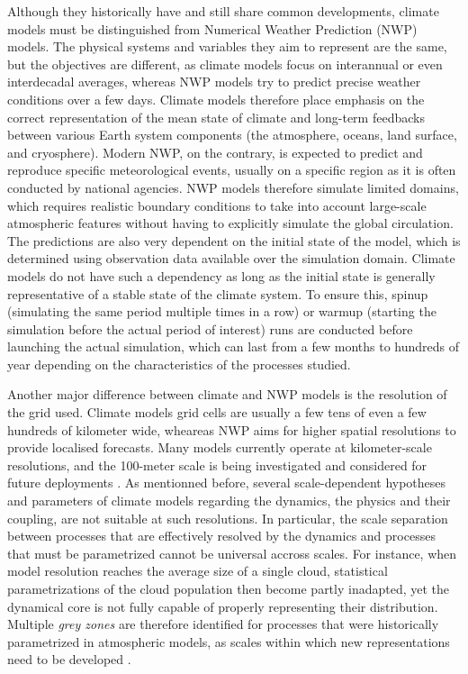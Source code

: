 Although they historically have and still share common developments, climate models must be distinguished from  Numerical Weather Prediction (NWP) models.
The physical systems and variables they aim to represent are the same, but the objectives are different, as climate models focus on interannual or even interdecadal averages, whereas NWP models try to predict precise weather conditions over a few days. 
Climate models therefore place emphasis on the correct representation of the mean state of climate and long-term feedbacks between various Earth system components (the atmosphere, oceans, land surface, and cryosphere).
Modern NWP, on the contrary, is expected to predict and reproduce specific meteorological events, usually on a specific region as it is often conducted by national agencies. NWP models therefore simulate limited domains, which requires realistic boundary conditions to take into account large-scale atmospheric features without having to explicitly simulate the global circulation. 
The predictions are also very dependent on the initial state of the model, which is determined using observation data available over the simulation domain. Climate models do not have such a dependency as long as the initial state is generally representative of a stable state of the climate system. To ensure this, spinup (simulating the same period multiple times in a row) or warmup (starting the simulation before the actual period of interest) runs are conducted before launching the actual simulation, which can last from a few months to hundreds of year depending on the characteristics of the processes studied.

Another major difference between climate and NWP models is the resolution of the grid used. Climate models grid cells are usually a few tens of even a few hundreds of kilometer wide, wheareas NWP aims for higher spatial resolutions to provide localised forecasts. Many models currently operate at kilometer-scale resolutions, and the 100-meter scale is being investigated and considered for future deployments \citep{lean_hectometric_2024}.
As mentionned before, several scale-dependent hypotheses and parameters of climate models regarding the dynamics, the physics and their coupling, are not suitable at such resolutions. In particular, the scale separation between processes that are effectively resolved by the dynamics and processes that must be parametrized cannot be universal accross scales. For instance, when model resolution reaches the average size of a single cloud, statistical parametrizations of the cloud population then become partly inadapted, yet the dynamical core is not fully capable of properly representing their distribution. Multiple \textit{grey zones} are therefore identified for processes that were historically parametrized in atmospheric models, as scales within which new representations need to be developed \citep{wei_research_2024,frassoni_building_2018,chow_crossing_2019}.

